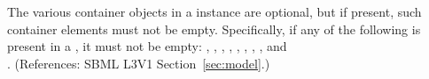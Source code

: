 The various  container objects in a \Model instance are
optional, but if present, such container elements must not be empty.
Specifically, if any of the following is present in a \Model, it must not
be empty: \ListOfFunctionDefinitions, \ListOfUnitDefinitions,
\mbox{\ListOfCompartments}, \ListOfSpecies, \ListOfParameters,
\ListOfInitialAssignments, \ListOfRules, \ListOfConstraints,
\mbox{\ListOfReactions} and \\ \ListOfEvents.  (References: SBML L3V1
Section~\ref{sec:model}.)
